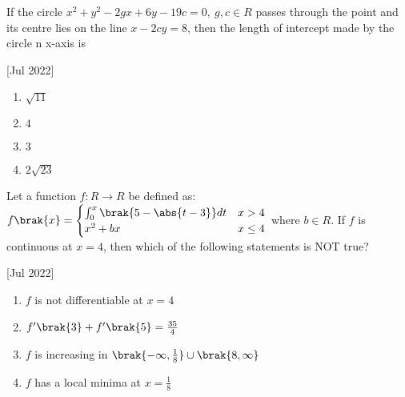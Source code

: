     \item If the circle $x^2+y^2-2gx+6y-19c=0,\ g,c\in R$ passes through the point  and its centre lies on the line $x-2cy=8$, then the length of intercept made by the circle n x-axis is 
    
    \hfill[Jul 2022]

		\begin{multicols}{4}
			\begin{enumerate}
				\item $\sqrt{11}$
				\item $4$
				\item $3$
				\item $2\sqrt{23}$
			\end{enumerate}
		\end{multicols}

    \item Let a function $f:R\to R$ be defined as:
    $f\brak{x}=
    \begin{cases}
    \int_0^x\brak{5-\abs{t-3}}dt & x>4\\
    x^2+bx & x\leq 4
    \end{cases}
    $ where $b\in R$. If $f$ is continuous at $x=4$, then which of the following statements is NOT true?
    
    \hfill[Jul 2022]

		\begin{multicols}{2}
			\begin{enumerate}
				\item $f$ is not differentiable at $x=4$
				\item $f'\brak{3}+f'\brak{5}=\frac{35}{4}$
				\item $f$ is increasing in $\brak{-\infty, \frac{1}{8}}\cup\brak{8,\infty}$
				\item $f$ has a local minima at $x=\frac{1}{8}$
			\end{enumerate}
		\end{multicols}
  
